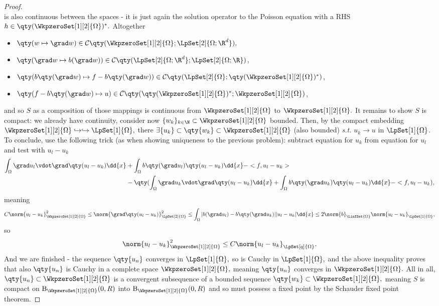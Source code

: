 \begin{example}
\begin{proof}
\[		\]
		is also continuous between the spaces - it is just again the solution operator to the Poisson equation with a RHS $h \in \qty(\WkpzeroSet[1][2]{\Omega})^{*}.$ Altogether
		\begin{itemize}
			\item $\qty(w \mapsto \grad w) \in \mathcal{C}\qty(\WkpzeroSet[1][2]{\Omega}; \LpSet[2]{\Omega;\R^{d}}),$
			\item $\qty(\grad w \mapsto b(\grad w)) \in \mathcal{C}\qty(\LpSet[2]{\Omega;\R^{d}}; \LpSet[2]{\Omega;\R})$,
			\item $\qty(b\qty(\grad w) \mapsto f - b\qty(\grad w)) \in \mathcal{C}\qty(\LpSet[2]{\Omega}; \qty(\WkpzeroSet[1][2]{\Omega})^{*})$,
			\item $\qty(f - b\qty(\grad w) \mapsto u) \in \mathcal{C}\qty(\qty(\WkpzeroSet[1][2]{\Omega})^{*}; \WkpzeroSet[1][2]{\Omega})$,
		\end{itemize}
		and so $S$ as a composition of those mappings is continuous from $\WkpzeroSet[1][2]{\Omega}$ to $\WkpzeroSet[1][2]{\Omega}.$ It remains to show $S$ is compact: we already have continuity, consider now $\{w_k\}_{k \in \N} \subset \WkpzeroSet[1][2]{\Omega}$ bounded. Then, by the compact embedding $\WkpzeroSet[1][2]{\Omega} \hookrightarrow \hookrightarrow \LpSet[1]{\Omega},$ there $\exists \{u_k\} \subset \qty{w_k} \subset \WkpzeroSet[1][2]{\Omega}$ (also bounded) \textit{s.t.} $u_k \to u$ in $\LpSet[1]{\Omega}$. To conclude, use the following trick (as when showing uniqueness to the previous problem): subtract equation for $u_k$ from equation for $u_l$ and test with $u_l - u_k$
		\begin{align*}
			\int_{\Omega}\grad u_l \vdot \grad\qty(u_l - u_k)\dd{x} &+ \int_{\Omega}b\qty(\grad u_l)\qty(u_l - u_k)\dd{x} - <f, u_l -u_k> \\
										&-\qty(\int_{\Omega}\grad u_k \vdot \grad\qty(u_l - u_k)\dd{x}+ \int_{\Omega}b\qty(\grad u_k)\qty(u_l - u_k)\dd{x} - <f, u_l - u_k),
		\end{align*}
		meaning
		\[
			C \norm{u_l - u_k}_{\WkpzeroSet[1][2]{\Omega}}^{2} \leq	\norm{\grad\qty(u_l - u_k)}_{\LpSet[2]{\Omega}}^{2} \leq \int_{\Omega}|b(\grad u_l) - b\qty(\grad u_k)| |u_l - u_k|\dd{x} \leq 2 \norm{b}_{\LinfSet{\Omega}}\norm{u_l-u_k}_{\LpSet[1]{\Omega}},
		\]
		so 
		\[
			\norm{u_l-u_k}_{\WkpzeroSet[1][2]{\Omega}}^{2} \leq C\norm{u_l-u_k}_{\LpSet[q]{\Omega}}.
		\]
	And we are finished - the sequence $\qty{u_n}$ converges in $\LpSet[1]{\Omega},$ so is Cauchy in $\LpSet[1]{\Omega},$ and the above inequality proves that also $\qty{u_n}$ is Cauchy in a complete space $\WkpzeroSet[1][2]{\Omega},$ meaning $\qty{u_n}$ converges in $\WkpzeroSet[1][2]{\Omega}.$ All in all, $\qty{u_n} \subset \WkpzeroSet[1][2]{\Omega}$ is a convergent subsequence of a bounded sequence $\qty{w_k} \subset \WkpzeroSet[1][2]{\Omega},$ meaning $S$ is compact on $\text{B}_{\WkpzeroSet[1][2]{\Omega}}(0,R)$ into $\text{B}_{\WkpzeroSet[1][2]{\Omega}}(0,R)$ and so must possess a fixed point by the Schauder fixed point theorem.
	\end{proof}
\end{example}


